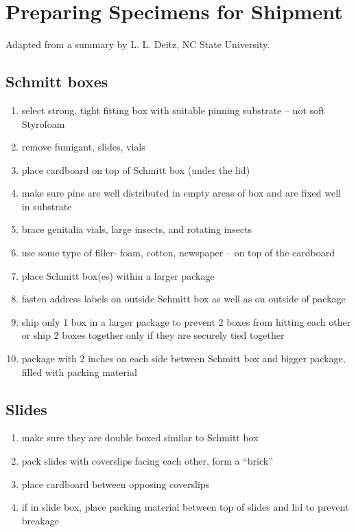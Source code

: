 \documentclass[letterpaper, 11pt]{article}
\begin{document}
\section{Preparing Specimens for Shipment}

Adapted from a summary by L. L. Deitz, NC State University.%
 

\subsection{Schmitt boxes}

\begin{enumerate}
\item select strong, tight fitting box with suitable pinning substrate – not soft Styrofoam
\item remove fumigant, slides, vials
\item place cardboard on top of Schmitt box (under the lid)
\item make sure pins are well distributed in empty areas of box and are fixed well in substrate
\item brace genitalia vials, large insects, and rotating insects
\item use some type of filler- foam, cotton, newspaper – on top of the cardboard
\item place Schmitt box(es) within a larger package
\item fasten address labels on outside Schmitt box as well as on outside of package
\item ship only 1 box in a larger package to prevent 2 boxes from hitting each other or ship 2 boxes together only if they are securely tied together
\item package with 2 inches on each side between Schmitt box and bigger package, filled with packing material
\end{enumerate}

\subsection*{Slides}

\begin{enumerate}
\item make sure they are double boxed similar to Schmitt box
\item pack slides with coverslips facing each other, form a “brick”
\item place cardboard between opposing coverslips
\item if in slide box, place packing material between top of slides and lid to prevent breakage
\end{enumerate}
\end{document}
